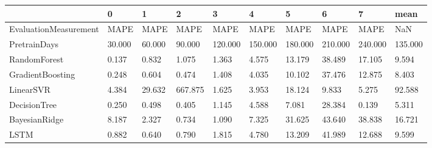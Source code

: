 \begin{tabular}{llllllllll}
\toprule
{} &      0 &      1 &       2 &       3 &       4 &       5 &       6 &       7 &    mean \\
\midrule
EvaluationMeasurement &   MAPE &   MAPE &    MAPE &    MAPE &    MAPE &    MAPE &    MAPE &    MAPE &     NaN \\
PretrainDays          & 30.000 & 60.000 &  90.000 & 120.000 & 150.000 & 180.000 & 210.000 & 240.000 & 135.000 \\
RandomForest          &  0.137 &  0.832 &   1.075 &   1.363 &   4.575 &  13.179 &  38.489 &  17.105 &   9.594 \\
GradientBoosting      &  0.248 &  0.604 &   0.474 &   1.408 &   4.035 &  10.102 &  37.476 &  12.875 &   8.403 \\
LinearSVR             &  4.384 & 29.632 & 667.875 &   1.625 &   3.953 &  18.124 &   9.833 &   5.275 &  92.588 \\
DecisionTree          &  0.250 &  0.498 &   0.405 &   1.145 &   4.588 &   7.081 &  28.384 &   0.139 &   5.311 \\
BayesianRidge         &  8.187 &  2.327 &   0.734 &   1.090 &   7.325 &  31.625 &  43.640 &  38.838 &  16.721 \\
LSTM                  &  0.882 &  0.640 &   0.790 &   1.815 &   4.780 &  13.209 &  41.989 &  12.688 &   9.599 \\
\bottomrule
\end{tabular}
